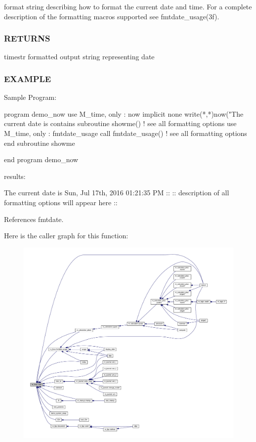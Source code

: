 \begin{DoxyVerb}
format string describing how to format the current date and time. For a complete description of the formatting macros supported see fmtdate\+\_\+usage(3f). \subsubsection*{R\+E\+T\+U\+R\+NS}

timestr formatted output string representing date

\subsubsection*{E\+X\+A\+M\+P\+LE}

\begin{DoxyVerb}Sample Program:

 program demo_now
 use M_time, only : now
 implicit none
    write(*,*)now("The current date is %
 contains
 subroutine showme() ! see all formatting options
    use M_time, only : fmtdate_usage
    call fmtdate_usage() ! see all formatting options
 end subroutine showme

 end program demo_now

results:

   The current date is Sun, Jul 17th, 2016 01:21:35 PM
    ::
    :: description of all formatting options will appear here
    :: \end{DoxyVerb}
 

References fmtdate.

Here is the caller graph for this function\+:
\nopagebreak
\begin{figure}[H]
\begin{center}
\leavevmode
\includegraphics[width=350pt]{namespacem__time_a6b5e87be0e510ff268c1ecfbf67a3bdb_icgraph}
\end{center}
\end{figure}
\mbox{\label{namespacem__time_a55e2cb9efc9d4d209ae2864f073d4f19}} 

\end{DoxyVerb}

